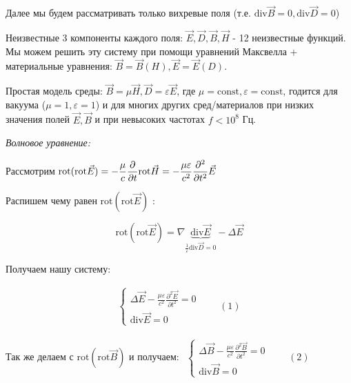 \documentclass[12pt, a4paper]{report}
\begin{document}
Далее мы будем рассматривать только вихревые поля (т.е. \( \mathrm{div} \vec{B} = 0 ,\mathrm{div} \vec{D} = 0  \))

Неизвестные 3 компоненты каждого поля: \( \vec{E},\vec{D},\vec{B},\vec{H}\) - 12 неизвестные функций. Мы можем решить эту систему при помощи уравнений Максвелла \( + \)  материальные уравнения: \( \vec{B}=\vec{B}(H), \vec{E}=\vec{E}(D) \).

Простая модель среды: \( \vec{B}=\mu\vec{H}, \vec{D}=\varepsilon \vec{E} \), где \( \mu = \mathrm{const}  , \varepsilon =\mathrm{const}   \), годится для вакуума (\(\mu=1, \varepsilon=1  \)) и для многих других сред/материалов при низких значения полей \( \vec{E}, \vec{B} \)  и при невысоких частотах \( f < 10^8 \) Гц. 
 
\newpage

\textit{Волновое уравнение:} 

Рассмотрим \(  \displaystyle  \mathrm{rot} (\mathrm{rot} \vec{E}  )= -\frac{\mu}{c}  \frac{\partial}{\partial t} \mathrm{rot } \vec{H}= - \frac{\mu \varepsilon}{ c ^2} \frac{\partial ^2}{\partial t ^2}     \vec{E} \\ \) 

Распишем чему равен \( \mathrm{rot}(\mathrm{rot}\vec{E}  )   \) :

\[         \displaystyle \mathrm{rot} (\mathrm{rot} \vec{E}  )= \nabla \underbrace{\mathrm{div} \vec{E}}_{\frac{1}{\varepsilon} \mathrm{div}\vec{D}=0   }    - \Delta \vec{E}   \] 

Получаем нашу систему:

\[
\begin{aligned}
    \begin{cases}
        \displaystyle \Delta \vec{E}- \frac{\mu \varepsilon}{c ^2} \frac{\partial ^2 \vec{E}}{\partial t ^2} =0 \\
        \displaystyle \mathrm{div}   \vec{E}=0 
    \end{cases} 
    \quad \quad  (1)
\end{aligned} 
\] 

Так же делаем с \( \mathrm{rot }(\mathrm{rot}\vec{B})\) и получаем: \( 
\begin{aligned}
    \begin{cases}
        \displaystyle  \Delta \vec{B} - \frac{\mu \varepsilon}{c ^2} \frac{\partial ^2 \vec{B}}{\partial t ^2} =0 \\
        \displaystyle \mathrm{div}   \vec{B}=0
    \end{cases}
    \quad \quad  (2)
\end{aligned} 
\)  
\end{document}
